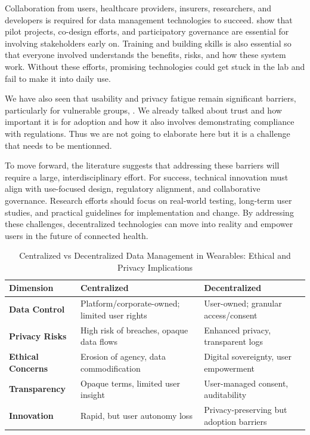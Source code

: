 	Collaboration from users, healthcare providers, insurers, researchers, and developers is required for data management technologies to succeed. \cite{Mun2010} show that pilot projects, co-design efforts, and participatory governance are essential for involving stakeholders early on. Training and building skills is also essential so that everyone involved understands the benefits, risks, and how these system work. Without these efforts, promising technologies could get stuck in the lab and fail to make it into daily use.

	We have also seen that usability and privacy fatigue remain significant barriers, particularly for vulnerable groups, \cite{Choi2018}. We already talked about trust and how important it is for adoption and how it also involves demonstrating compliance with regulations.
	Thus we are not going to elaborate here but it is a challenge that needs to be mentionned.

	To move forward, the literature suggests that addressing these barriers will require a large, interdisciplinary effort. For success, technical innovation must align with use-focused design, regulatory alignment, and collaborative governance. Research efforts should focus on real-world testing, long-term user studies, and practical guidelines for implementation and change. By addressing these challenges, decentralized technologies can move into reality and empower users in the future of connected health.

	\begin{table}[hbt]
		\centering
		\begin{tabular}{p{3.5cm} p{6.5cm} p{6.5cm}}
			\toprule
			\textbf{Dimension} & \textbf{Centralized} & \textbf{Decentralized} \\
			\midrule
			\textbf{Data Control} & Platform/corporate-owned; limited user rights & User-owned; granular access/consent \\
			\addlinespace
			\textbf{Privacy Risks} & High risk of breaches, opaque data flows & Enhanced privacy, transparent logs \\
			\addlinespace
			\textbf{Ethical Concerns} & Erosion of agency, data commodification & Digital sovereignty, user empowerment \\
			\addlinespace
			\textbf{Transparency} & Opaque terms, limited user insight & User-managed consent, auditability \\
			\addlinespace
			\textbf{Innovation} & Rapid, but user autonomy loss & Privacy-preserving but adoption barriers \\
			\bottomrule
		\end{tabular}
		\caption{Centralized vs Decentralized Data Management in Wearables: Ethical and Privacy Implications}
		\label{tab:centralized_vs_decentralized_brief}
	\end{table}

